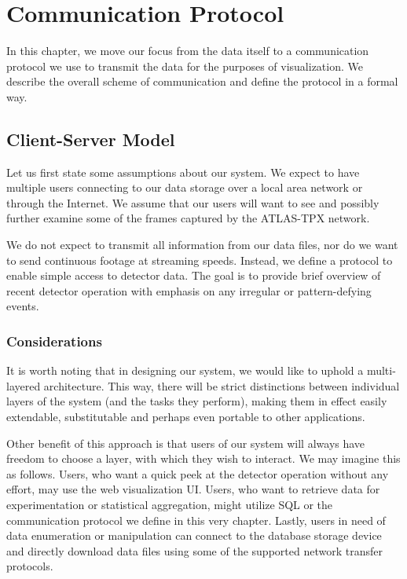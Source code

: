 \chapter{Communication Protocol}

In this chapter, we move our focus from the data itself to a communication protocol we use to transmit the data for the purposes of visualization. We describe the overall scheme of communication and define the protocol in a formal way.

\section{Client-Server Model}
Let us first state some assumptions about our system. We expect to have multiple users connecting to our data storage over a local area network or through the Internet. We assume that our users will want to see and possibly further examine some of the frames captured by the ATLAS-TPX network.

We do not expect to transmit all information from our data files, nor do we want to send continuous footage at streaming speeds. Instead, we define a protocol to enable simple access to detector data. The goal is to provide brief overview of recent detector operation with emphasis on any irregular or pattern-defying events.

\subsection{Considerations}
It is worth noting that in designing our system, we would like to uphold a multi-layered architecture. This way, there will be strict distinctions between individual layers of the system (and the tasks they perform), making them in effect easily extendable, substitutable and perhaps even portable to other applications.

Other benefit of this approach is that users of our system will always have freedom to choose a layer, with which they wish to interact. We may imagine this as follows. Users, who want a quick peek at the detector operation without any effort, may use the web visualization UI. Users, who want to retrieve data for experimentation or statistical aggregation, might utilize SQL or the communication protocol we define in this very chapter. Lastly, users in need of data enumeration or manipulation can connect to the database storage device and directly download data files using some of the supported network transfer protocols.

